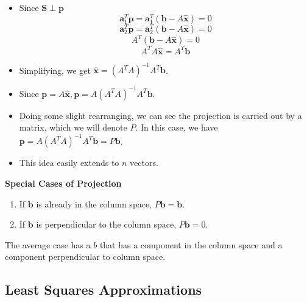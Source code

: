 \documentclass[11pt]{article}
\begin{document}
\begin{itemize}
    \item Since $\boldsymbol{S} \perp \boldsymbol{p}$
    \[ \boldsymbol{a}_1^T \boldsymbol{p} = \boldsymbol{a}_1^T (\boldsymbol{b} - A
    \boldsymbol{\hat{x}}) = 0 \]
    \[ \boldsymbol{a}_2^T \boldsymbol{p} = \boldsymbol{a}_2^T (\boldsymbol{b} - A
    \boldsymbol{\hat{x}}) = 0 \]
    \[ A^T(\boldsymbol{b} - A\boldsymbol{\hat{x}}) = 0\]
    \[ A^T A\boldsymbol{\hat{x}} = A^T \boldsymbol{b}\]
    \item Simplifying, we get $\boldsymbol{\hat{x}} = {(A^T A)}^{-1} A^T \boldsymbol{b}$.
    \item Since $\boldsymbol{p} = A\boldsymbol{\hat{x}}, \boldsymbol{p} = A{(A^T A)}^{-1} A^T 
    \boldsymbol{b}$.
    \item Doing some slight rearranging, we can see the projection is carried out by a matrix,
    which we will denote $P$. In this case, we have $\boldsymbol{p} = A{(A^T A)}^{-1} A^T 
    \boldsymbol{b} = P\boldsymbol{b}$.
    \item This idea easily extends to $n$ vectors.
\end{itemize}

\textbf{Special Cases of Projection}
\begin{enumerate}
    \item If $\boldsymbol{b}$ is already in the column space, $P\boldsymbol{b}=\boldsymbol{b}$.
    \item If $\boldsymbol{b}$ is perpendicular to the column space, $P\boldsymbol{b}=0$.
\end{enumerate}
The average case has a $b$ that has a component in the column space and a component 
perpendicular to column space. \\

\subsection{Least Squares Approximations}
\end{document}
